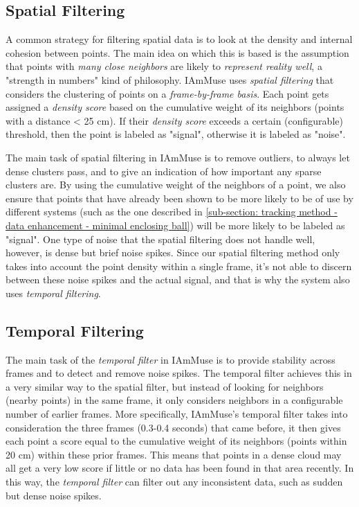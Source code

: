 \subsection{Spatial Filtering}
\label{sub-section: tracking method - data filtering - density filtering}

A common strategy for filtering spatial data is to look at the density and internal cohesion between points.
The main idea on which this is based is the assumption that points with \textit{many close neighbors} are likely to \textit{represent reality well}, a "strength in numbers" kind of philosophy.
IAmMuse uses \textit{spatial filtering} that considers the clustering of points on a \textit{frame-by-frame basis}.
Each point gets assigned a \textit{density score} based on the cumulative weight of its neighbors (points with a distance < 25 cm). 
If their \textit{density score} exceeds a certain (configurable) threshold, then the point is labeled as "signal", otherwise it is labeled as "noise".

The main task of spatial filtering in IAmMuse is to remove outliers, to always let dense clusters pass, and to give an indication of how important any sparse clusters are.
By using the cumulative weight of the neighbors of a point, we also ensure that points that have already been shown to be more likely to be of use by different systems (such as the one described in \cref{sub-section: tracking method - data enhancement - minimal enclosing ball}) will be more likely to be labeled as "signal".
One type of noise that the spatial filtering does not handle well, however, is dense but brief noise spikes.
Since our spatial filtering method only takes into account the point density within a single frame, it's not able to discern between these noise spikes and the actual signal, and that is why the system also uses \textit{temporal filtering}.



\subsection{Temporal Filtering}
\label{sub-section: tracking method - data filtering - temporal filtering}
The main task of the \textit{temporal filter} in IAmMuse is to provide stability across frames and to detect and remove noise spikes.
The temporal filter achieves this in a very similar way to the spatial filter, but instead of looking for neighbors (nearby points) in the same frame, it only considers neighbors in a configurable number of earlier frames.
More specifically, IAmMuse's temporal filter takes into consideration the three frames (0.3-0.4 seconds) that came before, it then gives each point a score equal to the cumulative weight of its neighbors (points within 20 cm) within these prior frames.
This means that points in a dense cloud may all get a very low score if little or no data has been found in that area recently.
In this way, the \textit{temporal filter} can filter out any inconsistent data, such as sudden but dense noise spikes.

